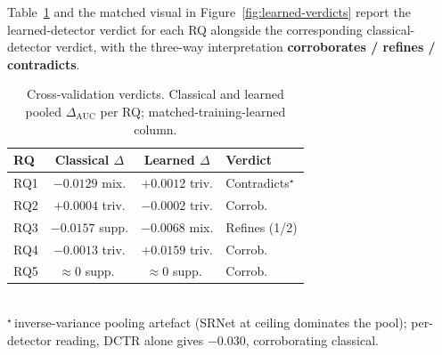 \documentclass[10pt,twocolumn,a4paper]{article}
\begin{document}
Table~\ref{tab:learned-verdicts} and the matched visual in Figure~\ref{fig:learned-verdicts} report the learned-detector verdict for each RQ alongside the corresponding classical-detector verdict, with the three-way interpretation \textbf{corroborates / refines / contradicts}.

\begin{table}[!htbp]
\centering\footnotesize
\caption{Cross-validation verdicts. Classical and learned pooled $\Delta_\text{AUC}$ per RQ; matched-training-learned column.}
\label{tab:learned-verdicts}
\setlength{\tabcolsep}{3pt}\renewcommand{\arraystretch}{1.05}
\begin{tabular}{@{}lccl@{}}
\toprule
\textbf{RQ} & \textbf{Classical $\Delta$} & \textbf{Learned $\Delta$} & \textbf{Verdict} \\
\midrule
RQ1     & $-0.0129$ mix.   & $+0.0012$ triv.  & Contradicts$^\star$ \\
RQ2     & $+0.0004$ triv.  & $-0.0002$ triv.  & Corrob.\ \\
RQ3     & $-0.0157$ supp.  & $-0.0068$ mix.   & Refines (1/2) \\
RQ4     & $-0.0013$ triv.  & $+0.0159$ triv.  & Corrob.\ \\
RQ5     & $\approx 0$ supp.\ & $\approx 0$ supp.\ & Corrob.\ \\
\bottomrule
\end{tabular}\\[1pt]
{\scriptsize $^\star$\,inverse-variance pooling artefact (SRNet at ceiling dominates the pool); per-detector reading, DCTR alone gives $-0.030$, corroborating classical.}
\end{table}
\end{document}
